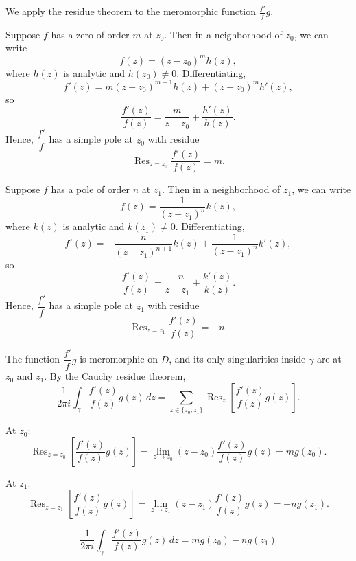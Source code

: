 \documentclass[12pt]{article}
\begin{document}
\begin{tcolorbox}[colback=solutioncol, title=\textbf{Solution}]

We apply the residue theorem to the meromorphic function $\displaystyle \frac{f'}{f}g$.

\begin{tcolorbox}[colback=stepcol, title=\textbf{Step 1: Behavior of \boldmath$\dfrac{f'}{f}$ at zeros and poles}, breakable]
Suppose $f$ has a zero of order $m$ at $z_0$. Then in a neighborhood of $z_0$, we can write
\[
f(z) = (z-z_0)^m h(z),
\]
where $h(z)$ is analytic and $h(z_0) \neq 0$. Differentiating,
\[
f'(z) = m(z-z_0)^{m-1}h(z) + (z-z_0)^m h'(z),
\]
so
\[
\frac{f'(z)}{f(z)} = \frac{m}{z-z_0} + \frac{h'(z)}{h(z)}.
\]
Hence, $\dfrac{f'}{f}$ has a simple pole at $z_0$ with residue
\[
\operatorname{Res}_{z=z_0} \frac{f'(z)}{f(z)} = m.
\]
\end{tcolorbox}

\begin{tcolorbox}[colback=stepcol, title=\textbf{Step 2: Behavior at poles}, breakable]
Suppose $f$ has a pole of order $n$ at $z_1$. Then in a neighborhood of $z_1$, we can write
\[
f(z) = \frac{1}{(z-z_1)^n}k(z),
\]
where $k(z)$ is analytic and $k(z_1) \neq 0$. Differentiating,
\[
f'(z) = -\frac{n}{(z-z_1)^{n+1}}k(z) + \frac{1}{(z-z_1)^n}k'(z),
\]
so
\[
\frac{f'(z)}{f(z)} = \frac{-n}{z-z_1} + \frac{k'(z)}{k(z)}.
\]
Hence, $\dfrac{f'}{f}$ has a simple pole at $z_1$ with residue
\[
\operatorname{Res}_{z=z_1} \frac{f'(z)}{f(z)} = -n.
\]
\end{tcolorbox}

\begin{tcolorbox}[colback=stepcol, title=\textbf{Step 3: Apply residue theorem}, breakable]
The function $\dfrac{f'}{f}g$ is meromorphic on $D$, and its only singularities inside $\gamma$ are at $z_0$ and $z_1$. By the Cauchy residue theorem,
\[
\frac{1}{2\pi i} \int_\gamma \frac{f'(z)}{f(z)}g(z)\, dz
= \sum_{z \in \{z_0, z_1\}} \operatorname{Res}_{z}\left[\frac{f'(z)}{f(z)}g(z)\right].
\]

At $z_0$:
\[
\operatorname{Res}_{z=z_0}\left[\frac{f'(z)}{f(z)}g(z)\right]
= \lim_{z\to z_0} (z-z_0)\frac{f'(z)}{f(z)}g(z)
= m g(z_0).
\]

At $z_1$:
\[
\operatorname{Res}_{z=z_1}\left[\frac{f'(z)}{f(z)}g(z)\right]
= \lim_{z\to z_1} (z-z_1)\frac{f'(z)}{f(z)}g(z)
= -n g(z_1).
\]
\end{tcolorbox}

\begin{tcolorbox}[colback=finalcol, colframe=black, title=\textbf{Final Answer}]
\[
\boxed{
\frac{1}{2\pi i} \int_\gamma \frac{f'(z)}{f(z)}g(z)\, dz = m g(z_0) - n g(z_1)
}
\]
\end{tcolorbox}

\end{tcolorbox}
\end{document}
